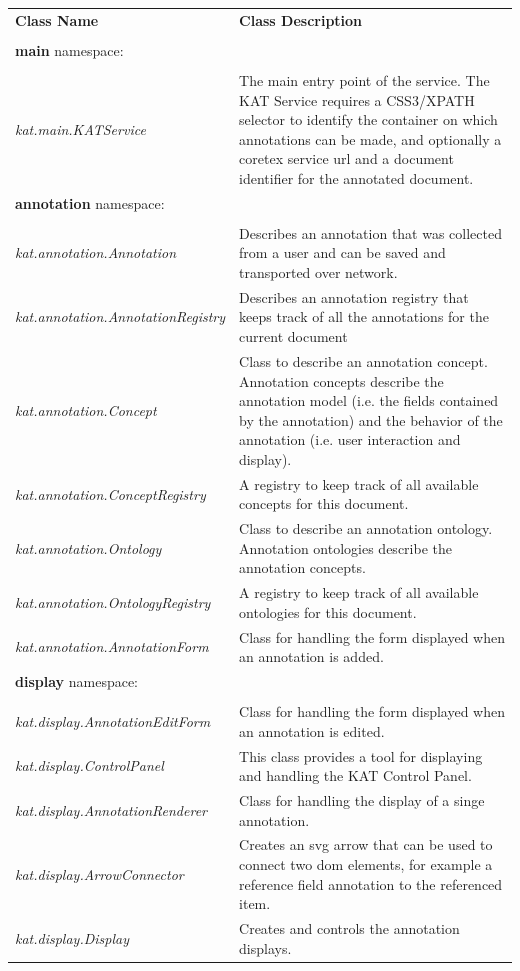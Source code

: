 \documentclass[a4paper, 12pt, notitlepage]{report}
\begin{document}
\begin{tabular}{p{6cm} | p{8cm} }
 \large{\textbf{Class Name}} & \large{\textbf{Class Description}}\\ \\ \hline
 \textbf{main} namespace: \\\\ \hline
 \textit{kat.main.KATService} & The main entry point of the service. The KAT Service requires a CSS3/XPATH selector to identify the container on which annotations can be made, 
 and optionally a coretex service url and a document identifier for the annotated document.\\ \hline
 \textbf{annotation} namespace: \\\\ \hline
 \textit{kat.annotation.Annotation} & Describes an annotation that was collected from a user and can be saved and transported over
 network.\\ \hline
 \textit{kat.annotation.AnnotationRegistry} & Describes an annotation registry that keeps track of all the annotations for the current document \\ \hline
 \textit{kat.annotation.Concept} & Class to describe an annotation concept. Annotation concepts describe the annotation model (i.e. the fields contained
 by the annotation) and the behavior of the annotation (i.e. user interaction and display).\\ \hline 
 \textit{kat.annotation.ConceptRegistry} & A registry to keep track of all available concepts for this document.\\ \hline
 \textit{kat.annotation.Ontology} & Class to describe an annotation ontology. Annotation ontologies describe the annotation concepts.\\ \hline
 \textit{kat.annotation.OntologyRegistry} & A registry to keep track of all available ontologies for this document.\\ \hline
 \textit{kat.annotation.AnnotationForm} & Class for handling the form displayed when an annotation is added.\\ \hline
 \textbf{display} namespace: \\\\ \hline
 \textit{kat.display.AnnotationEditForm} & Class for handling the form displayed when an annotation is edited.\\ \hline
 \textit{kat.display.ControlPanel} & This class provides a tool for displaying and handling the KAT Control Panel.\\ \hline
 \textit{kat.display.AnnotationRenderer} & Class for handling the display of a singe annotation.\\ \hline
 \textit{kat.display.ArrowConnector} &  Creates an svg arrow that can be used to connect two dom elements, for example a reference field annotation to the referenced item.\\ \hline
 \textit{kat.display.Display} & Creates and controls the annotation displays.\\ \hline
\end{tabular}
\end{document}
